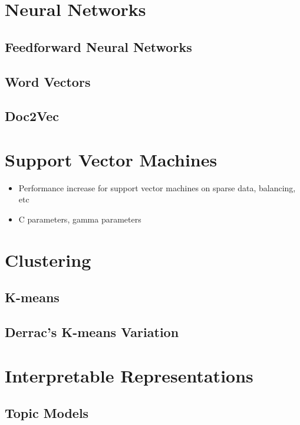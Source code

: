 \section{Neural Networks}



\subsection{Feedforward Neural Networks}

\subsection{Word Vectors}\label{bg:WordVectors}

\subsection{Doc2Vec}




\section{Support Vector Machines}\label{bg:SVM}
\begin{itemize}
	\item Performance increase for support vector machines on sparse data, balancing, etc
	\item C parameters, gamma parameters
\end{itemize}



\section{Clustering}\label{bg:clustering}

\subsection{K-means}

\subsection{Derrac's K-means Variation}

\section{Interpretable Representations}

\subsection{Topic Models}\label{bg:TopicModels}

